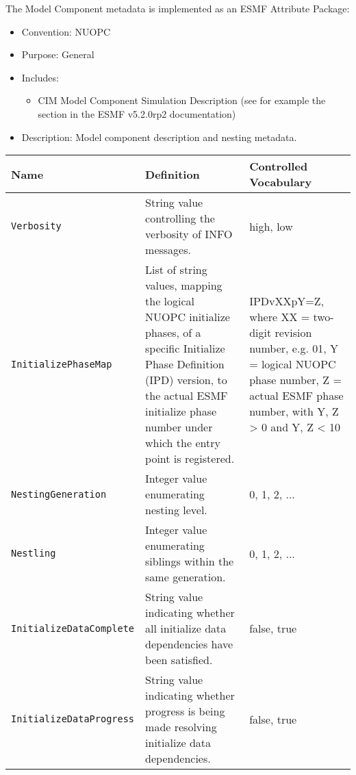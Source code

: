 The Model Component metadata is implemented as an ESMF Attribute Package:

\begin{itemize}
    \item Convention: NUOPC
    \item Purpose: General
    \item Includes:
    \begin{itemize}
      \item CIM Model Component Simulation Description (see for example the  section in the ESMF v5.2.0rp2 documentation)
    \end{itemize} 
    \item Description: Model component description and nesting metadata. 
\end{itemize}

\begin{tabular}{|p{5cm}|p{5cm}|p{35mm}|}
     \hline\hline
     {\bf Name} & {\bf Definition} & {\bf Controlled Vocabulary}\\
     \hline\hline
     {\tt Verbosity} & String value controlling the verbosity of INFO messages.& high, low\\
     {\tt InitializePhaseMap} & List of string values, mapping the logical NUOPC initialize phases, of a specific Initialize Phase Definition (IPD) version, to the actual ESMF initialize phase number under which the entry point is registered.& IPDvXXpY=Z, where XX = two-digit revision number, e.g. 01, Y = logical NUOPC phase number, Z = actual ESMF phase number, with Y, Z > 0 and Y, Z < 10 \\
     {\tt NestingGeneration} & Integer value enumerating nesting level.& 0, 1, 2, ...\\
     {\tt Nestling} & Integer value enumerating siblings within the same generation.& 0, 1, 2, ...\\
     {\tt InitializeDataComplete} & String value indicating whether all initialize data dependencies have been satisfied.& false, true\\
     {\tt InitializeDataProgress} & String value indicating whether progress is being made resolving initialize data dependencies.& false, true\\
     \hline\hline
\end{tabular}
